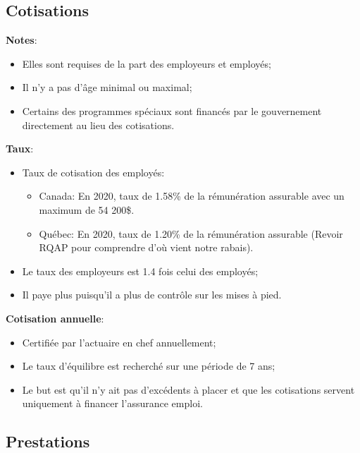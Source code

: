 \documentclass[10pt, french]{article}
\begin{document}
\begin{multicols*}{3}
\subsection*{Cotisations}
\textbf{Notes}:
\begin{itemize}[leftmargin = *]
	\item	Elles sont requises de la part des employeurs et employés;
	\item	Il n'y a pas d'âge minimal ou maximal;
	\item	Certains des programmes spéciaux sont financés par le gouvernement directement au lieu des cotisations.
\end{itemize}

\textbf{Taux}:
\begin{itemize}[leftmargin = *]
	\item	Taux de cotisation des employés:
		\begin{itemize}[leftmargin = *]
		\item	\textcolor{bulgarianrose}{Canada}:  En 2020, taux de 1.58\% de la rémunération assurable avec un maximum de 54 200\$.
		\item	\textcolor{blue(pigment)}{Québec}:  En 2020, taux de 1.20\% de la rémunération assurable (Revoir RQAP pour comprendre d'où vient notre rabais).
		\end{itemize}
	\item	Le taux des employeurs est 1.4 fois celui des employés;
	\item	Il paye plus puisqu'il a plus de contrôle sur les mises à pied.
\end{itemize}

\textbf{Cotisation annuelle}:
\begin{itemize}[leftmargin = *]
	\item	Certifiée par l'actuaire en chef annuellement;
	\item	Le taux d'équilibre est recherché sur une période de 7 ans;
	\item	Le but est qu'il n'y ait pas d'excédents à placer et que les cotisations servent uniquement à financer l'assurance emploi.
\end{itemize}

\subsection*{Prestations}


\end{multicols*}
\end{document}
